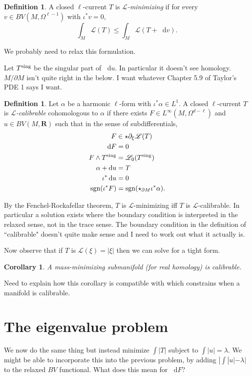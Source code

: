 \documentclass[reqno,11pt]{amsart}
\newcommand{\RR}{\mathbf{R}}
\newcommand*\dif{\mathop{}\!\mathrm{d}}
\newcommand{\Lagrange}{\mathscr L}
\newcommand{\sgn}{\mathrm{sgn}}
\newcommand{\dfn}[1]{\emph{#1}\index{#1}}
\newtheorem{corollary}[theorem]{Corollary}
\theoremstyle{definition}
\newtheorem{definition}[theorem]{Definition}
\numberwithin{equation}{section}
\begin{document}
\begin{definition}
A closed $\ell$-current $T$ is \dfn{$\Lagrange$-minimizing} if for every $v \in BV(M, \Omega^{\ell - 1})$ with $\iota^* v = 0$,
$$\int_M \Lagrange(T) \leq \int_M \Lagrange(T + \dif v).$$
\end{definition}

We probably need to relax this formulation.

Let $T^{\rm sing}$ be the singular part of $\dif u$.
In particular it doesn't see homology.
$M/\partial M$ isn't quite right in the below. I want whatever Chapter 5.9 of Taylor's PDE 1 says I want.

\begin{definition}
Let $\alpha$ be a harmonic $\ell$-form with $\iota^* \alpha \in L^1$.
A closed $\ell$-current $T$ is \dfn{$\Lagrange$-calibrable} cohomologous to $\alpha$ if there exists $F \in L^\infty(M, \Omega^{d - \ell})$ and $u \in BV(M, \RR)$ such that in the sense of subdifferentials,
\begin{align}
F &\in \star \partial_\xi \Lagrange(T) \\
\dif F &= 0 \\
F \wedge T^{\rm sing} &= \Lagrange_0(T^{\rm sing}) \\
\alpha + \dif u &= T \\
\iota^* \dif u &= 0 \\
\sgn(\iota^* F) &= \sgn(\star_{\partial M} \iota^* \alpha).
\end{align}
\end{definition}

By the Fenchel-Rockafellar theorem, $T$ is $\Lagrange$-minimizing iff $T$ is $\Lagrange$-calibrable.
In particular a solution exists where the boundary condition is interpreted in the relaxed sense, not in the trace sense.
The boundary condition in the definition of ``calibrable" doesn't quite make sense and I need to work out what it actually is.

Now observe that if $T$ is $\Lagrange(\xi) = |\xi|$ then we can solve for a tight form.

\begin{corollary}
A mass-minimizing submanifold (for real homology) is calibrable.
\end{corollary}

Need to explain how this corollary is compatible with \cite{liu2023homologically} which constrains when a manifold is calibrable.

\section{The eigenvalue problem}
We now do the same thing but instead minimize $\int |T|$ subject to $\int |u| = \lambda$.
We might be able to incorporate this into the previous problem, by adding $|\int|u| - \lambda|$ to the relaxed $BV$ functional.
What does this mean for $\dif F$?
\end{document}
